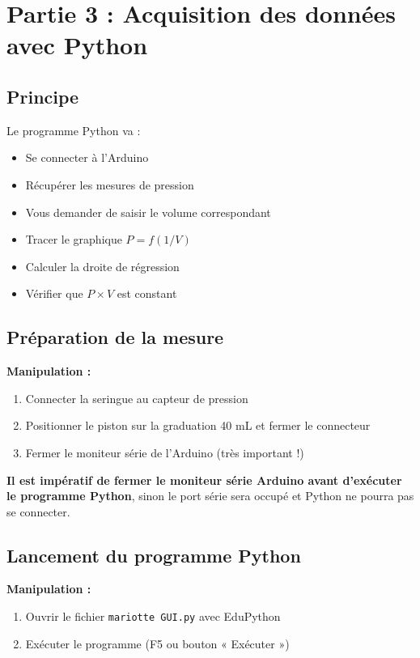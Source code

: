 \documentclass[11pt,a4paper]{article}
\begin{document}
\section{Partie 3 : Acquisition des données avec Python}

\subsection{Principe}

Le programme Python va :
\begin{itemize}
    \item Se connecter à l'Arduino
    \item Récupérer les mesures de pression
    \item Vous demander de saisir le volume correspondant
    \item Tracer le graphique $P = f(1/V)$
    \item Calculer la droite de régression
    \item Vérifier que $P \times V$ est constant
\end{itemize}

\subsection{Préparation de la mesure}

\textbf{Manipulation :}
\begin{enumerate}
    \item Connecter la seringue au capteur de pression
    \item Positionner le piston sur la graduation 40 mL et fermer le connecteur 
    \item Fermer le moniteur série de l'Arduino (très important !)
\end{enumerate}

\begin{attentionbox}
\textbf{Il est impératif de fermer le moniteur série Arduino avant d'exécuter le programme Python}, sinon le port série sera occupé et Python ne pourra pas se connecter.
\end{attentionbox}

\subsection{Lancement du programme Python}

\textbf{Manipulation :}
\begin{enumerate}
    \item Ouvrir le fichier \texttt{mariotte GUI.py} avec EduPython 
   
    \item Exécuter le programme (F5 ou bouton « Exécuter »)

\end{enumerate}
\end{document}
